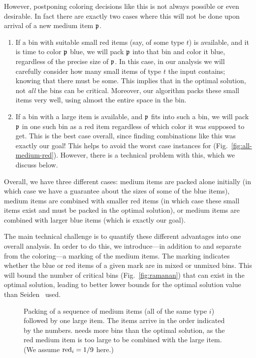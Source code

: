 However, postponing coloring decisions like this is not always possible or even desirable. In fact there are exactly two cases where this will not be done upon
arrival of a new medium item $\mathfrak{p}$.
\begin{enumerate}
	\item 
	If a bin with suitable small red items (say, of some type $t$)
	is available, and it is time to color $\mathfrak{p}$ blue,
	we will pack $\mathfrak{p}$ into that bin and color it blue, regardless of the precise size of $\mathfrak{p}$.
	In this case, in our analysis we will carefully consider how many small
	items of type $t$ the input contains; knowing that there must be some.
	This implies that in the optimal solution, not \emph{all} the bins can be critical.
	Moreover, our algorithm packs these small items very well, using almost the entire space in the bin.
	\item
	If a bin with a large item is available, and $\mathfrak{p}$ fits into such a bin, we will
	pack $\mathfrak{p}$ in one such bin as a red item regardless of which color it was supposed to get. 
	This is the best case overall, since finding combinations like this was exactly our goal! 
	This helps to avoid the worst case instances for {\SuperH} (Fig.~\ref{fig:all-medium-red}).
	However, there is a technical problem with this, which we discuss below.
\end{enumerate}

Overall, we have three different cases: medium items are packed alone initially (in which case we have a guarantee about the sizes of some of the blue items), medium items are combined with smaller red items (in which case these small items exist and must be packed in the optimal solution), or medium items are combined with larger blue items (which is exactly our goal).

The main technical challenge is to quantify these different advantages into one overall analysis. 
In order to do this, we introduce---in addition to and separate from the coloring---a marking of the medium items. The marking indicates whether the blue or red items of a given mark are in mixed or unmixed bins. This will bound the number of critical bins (Fig.~\ref{fig:ramanan}) that can exist in the optimal solution, leading to better lower bounds for the optimal solution value than Seiden~\cite{Seiden02} used.

\begin{figure}
	\begin{center}
		\hspace{7mm}
	\end{center}
	\caption{Packing of a sequence of medium items (all of the same type $i$) followed by one large item. The items arrive in the order indicated by the numbers. \SuperH{} needs more bins than the optimal solution, as the red medium item is too large to be combined with the large item. 
		(We assume $\mathrm{red}_i=1/9$ here.) \label{fig:red-too-large}}
\end{figure}

